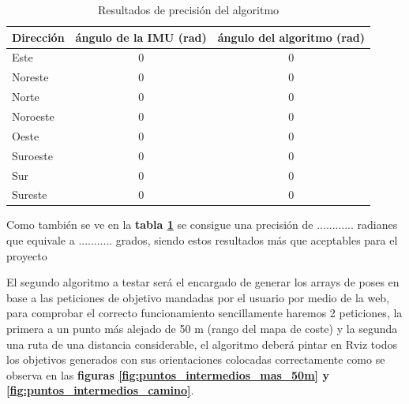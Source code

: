\begin{table}[h!]
    \centering
    \caption{Resultados de precisión del algoritmo}
    \begin{tabular}{|l|c|c|}
        \hline
        Dirección     & ángulo de la IMU (rad) & ángulo del algoritmo (rad)     \\ \hline
        Este           & 0 & 0 \\ \hline
        Noreste           & 0 & 0  \\ \hline
        Norte           & 0 & 0  \\ \hline
        Noroeste           & 0 & 0  \\ \hline
        Oeste           & 0 & 0  \\ \hline
        Suroeste            & 0 & 0  \\ \hline
        Sur           & 0 & 0 \\ \hline
        Sureste           & 0 & 0  \\ \hline
    \end{tabular}
    \label{tab:precisión_datumgen}
\end{table}


Como también se ve en la \textbf{tabla \ref{tab:precisión_datumgen}} se consigue una precisión de ............ radianes que equivale a ........... grados, siendo estos resultados más que aceptables 
para el proyecto

El segundo algoritmo a testar será el encargado de generar los arrays de poses en base a las peticiones de objetivo mandadas por el usuario por medio de 
la web, para comprobar el correcto funcionamiento sencillamente haremos 2 peticiones, la primera a un punto más alejado de 50 m (rango del mapa de coste) y la segunda una ruta de una distancia considerable, el algoritmo deberá pintar en Rviz 
todos los objetivos generados con sus orientaciones colocadas correctamente como se observa en las \textbf{figuras \ref{fig:puntos_intermedios_mas_50m} y \ref{fig:puntos_intermedios_camino}}.


